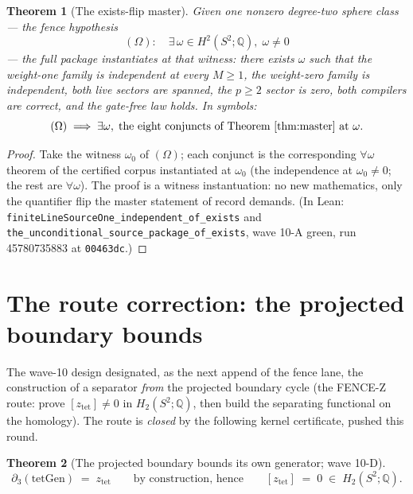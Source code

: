 \documentclass[11pt,a4paper]{article}
\theoremstyle{plain}
\newtheorem{theorem}{Theorem}[section]
\theoremstyle{definition}
\newcommand{\Q}{\mathbb{Q}}
\begin{document}
\begin{theorem}[The exists-flip master]\label{thm:exists-flip}
Given one nonzero degree-two sphere class --- the fence hypothesis
\[
(\Omega):\quad \exists\, \omega \in H^2(S^2;\Q),\; \omega \ne 0
\]
--- the full package instantiates at that witness: there exists
$\omega$ such that the weight-one family is independent at every $M
\ge 1$, the weight-zero family is independent, both live sectors are
spanned, the $p \ge 2$ sector is zero, both compilers are correct,
and the gate-free law holds.  In symbols:
\[
(\Omega) \;\Longrightarrow\; \exists \omega,\;
\text{the eight conjuncts of Theorem~\ref{thm:master} at }
\omega .
\]
\end{theorem}

\begin{proof}
Take the witness $\omega_0$ of $(\Omega)$; each conjunct is the
corresponding $\forall\omega$ theorem of the certified corpus
instantiated at $\omega_0$ (the independence at $\omega_0 \ne 0$;
the rest are $\forall\omega$).  The proof is a witness
instantuation: no new mathematics, only the quantifier flip the
master statement of record demands.  (In Lean:
\texttt{finiteLineSourceOne\_independent\_of\_exists} and
\texttt{the\_unconditional\_source\_package\_of\_exists}, wave 10-A
green, run 45780735883 at \texttt{00463dc}.)
\end{proof}

\section{The route correction: the projected boundary bounds}
\label{sec:correction}

The wave-10 design designated, as the next append of the fence lane,
the construction of a separator \emph{from} the projected boundary
cycle (the FENCE-Z route: prove $[z_{\mathrm{tet}}] \ne 0$ in
$H_2(S^2;\Q)$, then build the separating functional on the
homology).  The route is \emph{closed} by the following kernel
certificate, pushed this round.

\begin{theorem}[The projected boundary bounds its own generator;
wave 10-D]\label{thm:bounds}
\[
\partial_3(\mathrm{tetGen}) \;=\; z_{\mathrm{tet}}
\qquad\text{by construction, hence}\qquad
[z_{\mathrm{tet}}] \;=\; 0 \;\in\; H_2(S^2;\Q).
\]
\end{theorem}
\end{document}
